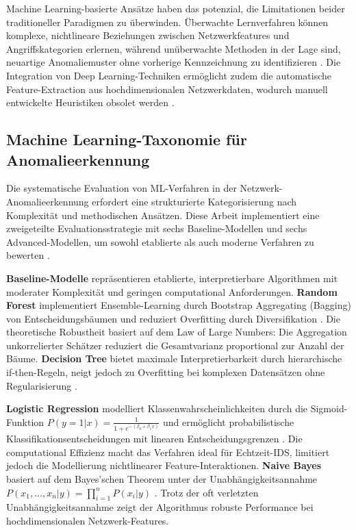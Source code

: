 \documentclass[11pt,a4paper]{article}
\begin{document}
    Machine Learning-basierte Ansätze haben das potenzial, die Limitationen beider traditioneller Paradigmen zu überwinden. Überwachte Lernverfahren können komplexe, nichtlineare Beziehungen zwischen Netzwerkfeatures und Angriffskategorien erlernen, während unüberwachte Methoden in der Lage sind, neuartige Anomaliemuster ohne vorherige Kennzeichnung zu identifizieren \parencite{Vinayakumar2019}. Die Integration von Deep Learning-Techniken ermöglicht zudem die automatische Feature-Extraction aus hochdimensionalen Netzwerkdaten, wodurch manuell entwickelte Heuristiken obsolet werden \parencite{Goodfellow2016}.

    \subsection{Machine Learning-Taxonomie für Anomalieerkennung}

    Die systematische Evaluation von ML-Verfahren in der Netzwerk-Anomalieerkennung erfordert eine strukturierte Kategorisierung nach Komplexität und methodischen Ansätzen. Diese Arbeit implementiert eine zweigeteilte Evaluationsstrategie mit sechs Baseline-Modellen und sechs Advanced-Modellen, um sowohl etablierte als auch moderne Verfahren zu bewerten \parencite{Vinayakumar2019}.

    \textbf{Baseline-Modelle} repräsentieren etablierte, interpretierbare Algorithmen mit moderater Komplexität und geringen computational Anforderungen. \textbf{Random Forest} implementiert Ensemble-Learning durch Bootstrap Aggregating (Bagging) von Entscheidungsbäumen und reduziert Overfitting durch Diversifikation \parencite{Hastie2009}. Die theoretische Robustheit basiert auf dem Law of Large Numbers: Die Aggregation unkorrelierter Schätzer reduziert die Gesamtvarianz proportional zur Anzahl der Bäume. \textbf{Decision Tree} bietet maximale Interpretierbarkeit durch hierarchische if-then-Regeln, neigt jedoch zu Overfitting bei komplexen Datensätzen ohne Regularisierung \parencite{Hastie2009}.

    \textbf{Logistic Regression} modelliert Klassenwahrscheinlichkeiten durch die Sigmoid-Funktion $P(y=1|x) = \frac{1}{1+e^{-(\beta_0 + \beta_1 x)}}$ und ermöglicht probabilistische Klassifikationsentscheidungen mit linearen Entscheidungsgrenzen \parencite{Bishop2006}. Die computational Effizienz macht das Verfahren ideal für Echtzeit-IDS, limitiert jedoch die Modellierung nichtlinearer Feature-Interaktionen. \textbf{Naive Bayes} basiert auf dem Bayes'schen Theorem unter der Unabhängigkeitsannahme $P(x_1,...,x_n|y) = \prod_{i=1}^{n} P(x_i|y)$ \parencite{Bishop2006}. Trotz der oft verletzten Unabhängigkeitsannahme zeigt der Algorithmus robuste Performance bei hochdimensionalen Netzwerk-Features.
\end{document}
